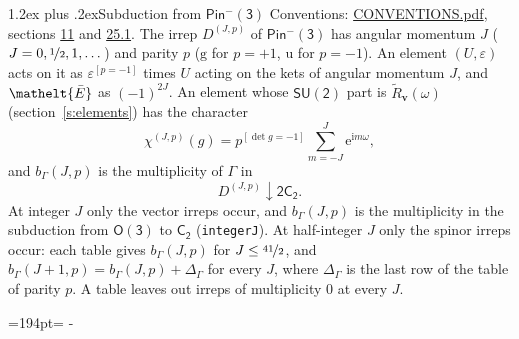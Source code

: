 \documentclass[10pt,a4paper]{article}
\makeatletter
\renewcommand\section{\@startsection{section}{1}{\z@}{-3ex plus -1ex minus -.2ex}%
  {1.2ex plus .2ex}{\normalfont\large\sffamily\bfseries\color{parttitle}}}
\newcommand{\needspace}[1]{\par\penalty-100\begingroup\dimen0=#1\relax\dimen2=\pagegoal
  \advance\dimen2-\pagetotal\ifdim\dimen0>\dimen2\relax\ifdim\dimen2>0pt\vfil\break\fi\fi
  \endgroup}
\numberwithin{equation}{section}
\newcommand{\eltfont}[1]{{\let\sigma\eltsigma\mathelt{#1}}}
\newcommand{\grp}[1]{\mathsf{#1}}
\newcommand{\elt}[1]{\eltfont{#1}}
\newcommand{\ptag}[1]{\mathrm{#1}}
\newcommand{\iverson}[1]{[#1]}
\newcommand{\restr}[2]{#1\!\downarrow#2}
\newcommand{\vv}{\mathbf{v}}
\newcommand{\iunit}{\mathrm{i}}
\newcommand{\expe}{\mathrm{e}}
\newcommand{\irrJp}[2]{D^{(#1,#2)}}
\newcommand{\barred}[1]{\bar{#1}}
\newcommand{\lift}[1]{\tilde{#1}}
\makeatother
\begin{document}
\section{Subduction from \texorpdfstring{$\grp{Pin^{-}(3)}$}{Pin(3)}}\label{s:subduction_parent}
Conventions: \href{../../CONVENTIONS.pdf}{CONVENTIONS.pdf}, sections \href{../../../rotation/CONVENTIONS.pdf\#conv.11}{11} and \href{../../CONVENTIONS.pdf\#conv.25.1}{25.1}.
\leavevmode\label{n:index.J}\label{n:index.parity}\label{n:irrep.o3}The irrep $\irrJp{J}{p}$ of \href{Pinminus3.pdf}{$\grp{Pin^{-}(3)}$} has angular momentum $J$ ($J = 0, \nicefrac{1}{2}, 1, \dots$) and parity $p$ ($\ptag{g}$ for $p = +1$, $\ptag{u}$ for $p = -1$). An element $(U, \varepsilon)$ acts on it as $\varepsilon^{[p = -1]}$ times $U$ acting on the kets of angular momentum $J$, and $\elt{\barred{E}}$ as $(-1)^{2J}$. \label{n:function.character.parent}\label{n:function.multiplicity}An element whose $\grp{SU(2)}$ part is $\lift{R}_{\vv}(\omega)$ (section~\ref{s:elements}) has the character
\begin{equation}\label{e:chi}\chi^{(J,p)}(g) = p^{\iverson{\det g = -1}}\sum_{m=-J}^{J} \expe^{\iunit m\omega},\end{equation}
and $b_\Gamma(J, p)$ is the multiplicity of $\Gamma$ in
\begin{equation}\label{e:parent}\restr{\irrJp{J}{p}}{\grp{2C_{2}}}.\end{equation}
At integer $J$ only the vector irreps occur, and $b_\Gamma(J, p)$ is the multiplicity in the subduction from $\grp{O(3)}$ to \href{../../../rotation/data/pdf/C2.pdf}{$\grp{C_{2}}$} (\texttt{integerJ}). \label{n:index.increment}At half-integer $J$ only the spinor irreps occur: each table gives $b_\Gamma(J, p)$ for $J \le \nicefrac{41}{2}$, and $b_\Gamma(J + 1, p) = b_\Gamma(J, p) + \Delta_\Gamma$ for every $J$, where $\Delta_\Gamma$ is the last row of the table of parity $p$. A table leaves out irreps of multiplicity 0 at every $J$.
\needspace{194pt}
\end{document}
